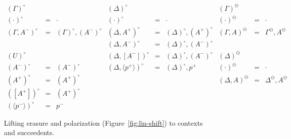 \begin{figure}
{\small \[
\begin{array}{rcl|rcl|rcl}
{(\Gamma)^\circ} & & &
{(\Delta)^\circ} & & &
{(\Gamma)^\ominus} & & 
\\
(\cdot)^\circ & \!\!\!=\!\!\! & \cdot &
(\cdot)^\circ & \!\!\!=\!\!\! & \cdot &
(\cdot)^\ominus & \!\!\!=\!\!\! & \cdot 
\\
(\Gamma, A^-)^\circ & \!\!\!=\!\!\! & (\Gamma)^\circ, (A^-)^\circ &
(\Delta, A^+)^\circ & \!\!\!=\!\!\! & (\Delta)^\circ, (A^+)^\circ &
(\Gamma, A)^\ominus & \!\!\!=\!\!\! & \Gamma^\ominus, A^\ominus 
\\
& & & 
(\Delta, A^-)^\circ & \!\!\!=\!\!\! & (\Delta)^\circ, (A^-)^\circ &
& & 
\\
(U)^\circ & & &
(\Delta, [ A^- ])^\circ & \!\!\!=\!\!\! & (\Delta)^\circ, (A^-)^\circ & 
(\Delta)^\ominus & &
\\
(A^-)^\circ &  \!\!\!=\!\!\! & (A^-)^\circ &
(\Delta, \langle p^+ \rangle)^\circ & \!\!\!=\!\!\! & (\Delta)^\circ, p^+ & 
(\cdot)^\ominus & \!\!\!=\!\!\! & \cdot
\\
(A^+)^\circ &  \!\!\!=\!\!\! & (A^+)^\circ &
& & &
(\Delta, A)^\ominus & \!\!\!=\!\!\! & \Delta^\ominus, A^\ominus
\\
([A^+])^\circ &  \!\!\!=\!\!\! & (A^+)^\circ &
& & &
& &
\\
(\langle p^- \rangle)^\circ &  \!\!\!=\!\!\! & p^- &
& & & 
& &
\end{array}\]}
\caption{Lifting erasure and polarization (Figure~\ref{fig:lin-shift}) to
contexts and succeedents.}
\label{fig:lin-shift-ctx}
\end{figure}
